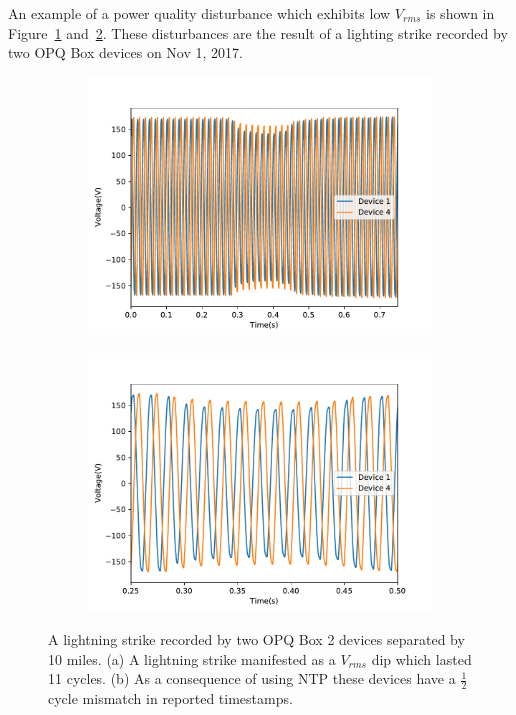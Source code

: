 An example of a power quality disturbance which exhibits low $V_{rms}$ is shown in Figure~\ref{fig:opq:6:1} and~\ref{fig:opq:6:2}.
These disturbances are the result of a lighting strike recorded by two OPQ Box devices on Nov 1, 2017.

\begin{figure}[h]
		\centering
	\begin{subfigure}{.5\textwidth}
	  \centering
	  \includegraphics[width=0.9\linewidth]{images/opq-box/voltage_sag.pdf}
	  \caption{}
	  \label{fig:opq:6:1}
	\end{subfigure}%
	\begin{subfigure}{.5\textwidth}
	  \centering
	  \includegraphics[width=0.9\linewidth]{images/opq-box/voltage_sag_zoomed_in.pdf}
	  \caption{}
	  \label{fig:opq:6:2}
	\end{subfigure}
	\caption{A lightning strike recorded by two OPQ Box 2 devices separated by 10 miles. (a) A lightning strike manifested as a $V_{rms}$ dip which lasted 11 cycles. (b) As a consequence of using NTP these devices have a $\frac{1}{2}$ cycle mismatch in reported timestamps.}
	\label{fig:opq:6}
\end{figure}


